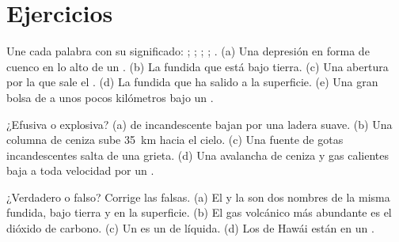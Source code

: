 \section{Ejercicios}

\begin{exercise}[$\star$]\label{exo:g7:volcanoes:1}
Une cada palabra con su significado: ; ; ; ; . (a) Una depresión en forma de cuenco en lo alto de un
. (b) La  fundida que está bajo tierra. (c) Una abertura por la
que sale el . (d) La  fundida que ha salido a la superficie.
(e) Una gran bolsa de  a unos pocos kilómetros bajo un .
\end{exercise}

\begin{exercise}[$\star$]\label{exo:g7:volcanoes:2}
¿Efusiva o explosiva? (a)  de  incandescente bajan por una ladera
suave. (b) Una columna de ceniza sube \qty{35}{km} hacia el cielo. (c) Una
fuente de gotas incandescentes salta de una grieta. (d) Una avalancha de
ceniza y gas calientes baja a toda velocidad por un .
\end{exercise}

\begin{exercise}[$\star$]\label{exo:g7:volcanoes:3}
¿Verdadero o falso? Corrige las falsas. (a) El  y la  son dos
nombres de la misma  fundida, bajo tierra y en la superficie. (b) El
gas volcánico más abundante es el dióxido de carbono. (c) Un  es un  de  líquida. (d) Los  de Hawái están en
un .
\end{exercise}

